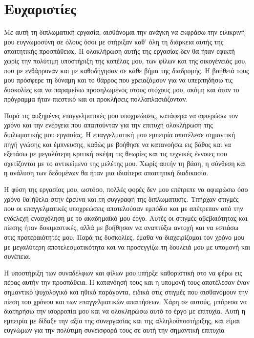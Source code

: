 \chapter*{Ευχαριστίες}

Με αυτή τη διπλωματική εργασία, αισθάνομαι την ανάγκη να εκφράσω την ειλικρινή μου ευγνωμοσύνη σε όλους όσοι με στήριξαν καθ' όλη τη διάρκεια αυτής της 
απαιτητικής προσπάθειας. Η ολοκλήρωση αυτής της εργασίας δεν θα ήταν εφικτή χωρίς την πολύτιμη υποστήριξη της κοπέλας μου, των φίλων και της οικογένειάς μου, 
που με ενθάρρυναν και με καθοδήγησαν σε κάθε βήμα της διαδρομής. Η βοήθειά τους μου πρόσφερε τη δύναμη και το θάρρος που χρειαζόμουν για να υπερπηδήσω τις 
δυσκολίες και να παραμείνω προσηλωμένος στους στόχους μου, ακόμη και όταν το πρόγραμμα ήταν πιεστικό και οι προκλήσεις πολλαπλασιάζονταν.

Παρά τις αυξημένες επαγγελματικές μου υποχρεώσεις, κατάφερα να αφιερώσω τον χρόνο και την ενέργεια που απαιτούνταν για την επιτυχή ολοκλήρωση της 
διπλωματικής μου εργασίας. Η επαγγελματική μου εμπειρία αποτέλεσε σημαντική πηγή γνώσης και έμπνευσης, καθώς με βοήθησε να κατανοήσω εις βάθος και 
να εξετάσω με μεγαλύτερη κριτική σκέψη τις θεωρίες και τις τεχνικές έννοιες που σχετίζονται με το αντικείμενο της μελέτης μου. Χωρίς αυτήν τη βάση, η 
σύνθεση και η ανάλυση των δεδομένων θα ήταν μια ιδιαίτερα απαιτητική διαδικασία.

Η φύση της εργασίας μου, ωστόσο, πολλές φορές δεν μου επέτρεπε να αφιερώσω όσο χρόνο θα ήθελα στην έρευνα και τη συγγραφή της διπλωματικής. 
Υπήρχαν στιγμές που οι επαγγελματικές υποχρεώσεις αποτελούσαν εμπόδιο και με απέτρεπαν από την ενδελεχή ενασχόληση με το ακαδημαϊκό μου έργο. 
Αυτές οι στιγμές αβεβαιότητας και πίεσης ήταν δοκιμαστικές, αλλά με βοήθησαν να αναπτύξω αντοχή και να εστιάσω στις προτεραιότητές μου. 
Παρά τις δυσκολίες, έμαθα να διαχειρίζομαι τον χρόνο μου με μεγαλύτερη αποτελεσματικότητα και να προσεγγίζω τη δουλειά μου με υπομονή και συνέπεια.

Η υποστήριξη των συναδέλφων και φίλων μου υπήρξε καθοριστική στο να φέρω εις πέρας αυτήν την προσπάθεια. Η κατανόησή τους και η υπομονή τους 
αποτέλεσαν έναν σημαντικό ψυχολογικό και ηθικό παράγοντα, ειδικά στις στιγμές που αισθανόμουν την πίεση του χρόνου και των επαγγελματικών απαιτήσεων. 
Χάρη σε αυτούς, μπόρεσα να διατηρήσω την ισορροπία μου και να ολοκληρώσω αυτό το έργο με επιτυχία. Αυτή η εμπειρία με δίδαξε την αξία της συνεργασίας 
και της αλληλοϋποστήριξης, και είμαι ευγνώμων για την πολύτιμη συνεισφορά τους σε αυτή την σημαντική επιτυχία